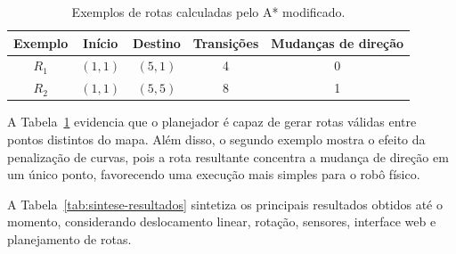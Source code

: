 \documentclass[	12pt, Times, openright, twoside, a4paper, english, brazil]{abntex2}
\begin{document}
\begin{table}[H]
	\centering
	\caption{Exemplos de rotas calculadas pelo A* modificado.}
	\label{tab:exemplos_rotas_astar}
	\begin{tabular}{c c c c c}
		\hline
		\textbf{Exemplo} & \textbf{Início} & \textbf{Destino} & \textbf{Transições} & \textbf{Mudanças de direção} \\
		\hline
		\(R_1\) & \((1,1)\) & \((5,1)\) & 4 & 0 \\
		\(R_2\) & \((1,1)\) & \((5,5)\) & 8 & 1 \\
		\hline
	\end{tabular}
\end{table}

A Tabela~\ref{tab:exemplos_rotas_astar} evidencia que o planejador é capaz de gerar rotas válidas entre pontos distintos do mapa. Além disso, o segundo exemplo mostra o efeito da penalização de curvas, pois a rota resultante concentra a mudança de direção em um único ponto, favorecendo uma execução mais simples para o robô físico.


A Tabela~\ref{tab:sintese-resultados} sintetiza os principais resultados obtidos até o momento, considerando deslocamento linear, rotação, sensores, interface web e planejamento de rotas.
\end{document}
